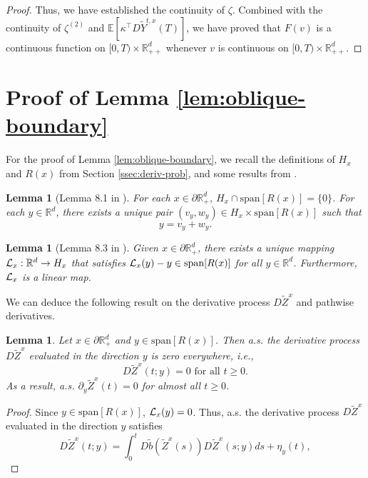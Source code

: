 \documentclass[11pt]{article}
\theoremstyle{definition}
\theoremstyle{plain}
\newtheorem{lemma}[assumption]{Lemma}
\newcommand{\E}{\mathbb{E}}
\newcommand{\cL}{{\cal L}}
\newcommand{\tb}{\tilde{b}}
\begin{document}
\begin{appendices}
\begin{proof}
Thus, we have established the continuity  
of $\zeta$. %
Combined with the continuity of \( \zeta^{(2)} \) and $\E\left[\kappa^{\top} D\tilde Y^{t,x}(T)\right]$,  
we have proved that \( F(v) \) is a continuous  
function on \( [0,T) \times \mathbb{R}_{++}^d \) whenever \( v \) is  
continuous on \( [0,T) \times \mathbb{R}_{++}^d \). 
\end{proof}

\section{Proof of Lemma \ref{lem:oblique-boundary}}\label{sec:appendix-oblique-boundary}
For the proof of Lemma \ref{lem:oblique-boundary}, we recall the definitions of $H_x$ and $R(x)$ from Section \ref{ssec:deriv-prob}, 
and some results from \cite{LipshutzRamanan2018}. 
\begin{lemma} [Lemma 8.1 in \cite{LipshutzRamanan2018}]\label{lem:decompose}
For each \( x \in \partial \mathbb{R}_+^d \), \( H_x \cap \text{span}[R(x)] = \{ 0 \} \).  
For each \( y \in \mathbb{R}^d \), there exists a unique pair $(v_y, w_y) \in H_x \times \text{span}[R(x)]$ such that 
\[
y = v_y + w_y.
\]
\end{lemma}
\begin{lemma}[Lemma 8.3 in \cite{LipshutzRamanan2018}]\label{lem:L_x}
Given \( x \in \partial \mathbb{R}_+^d \), 
there exists a unique mapping  
$\cL_x : \mathbb{R}^d \to H_x$ that satisfies $\cL_x(y) - y \in \text{span}[R(x)]$ for all $y \in \mathbb{R}^d$.
Furthermore, \( \cL_x \) is a linear map.
\end{lemma}
We can deduce the following result on the derivative process $D\tilde Z^x$ and pathwise derivatives.
\begin{lemma}\label{lem:deriv-proc}
Let \( x \in \partial \mathbb{R}_+^d \) and \( y \in \text{span}[R(x)] \). Then a.s. the derivative process $D\tilde Z^x$ 
evaluated in the direction $y$ is zero everywhere, i.e.,
\[
D \tilde Z^x(t; y) = 0 \text{ for all } t \geq 0.
\]
As a result, a.s. $\partial_y \tilde{Z}^x(t) = 0$ for almost all $t \geq 0$.
\end{lemma}
\begin{proof}
Since \( y \in \text{span}[R(x)] \), \( \cL_x(y) = 0 \). Thus, a.s. the derivative process \( D\tilde{Z}^x \) evaluated in the direction $y$ satisfies
\[
D\tilde{Z}^x(t; y) = \int_0^t D\tb(\tilde{Z}^x(s)) D\tilde{Z}^x(s; y) ds + \eta_y(t),
\]
\end{proof}
\end{appendices}
\end{document}
